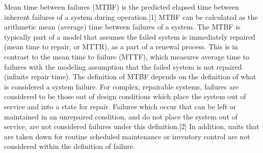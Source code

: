 Mean time between failures (MTBF) is the predicted elapsed time between inherent failures of a system during operation.[1] MTBF can be calculated as the arithmetic mean (average) time between failures of a system. The MTBF is typically part of a model that assumes the failed system is immediately repaired (mean time to repair, or MTTR), as a part of a renewal process. This is in contrast to the mean time to failure (MTTF), which measures average time to failures with the modeling assumption that the failed system is not repaired (infinite repair time).
The definition of MTBF depends on the definition of what is considered a system failure. For complex, repairable systems, failures are considered to be those out of design conditions which place the system out of service and into a state for repair. Failures which occur that can be left or maintained in an unrepaired condition, and do not place the system out of service, are not considered failures under this definition.[2] In addition, units that are taken down for routine scheduled maintenance or inventory control are not considered within the definition of failure.
